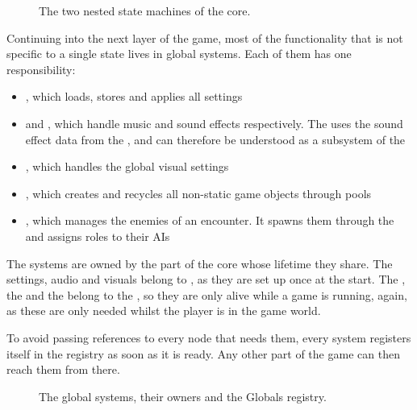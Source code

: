 \documentclass[../Main.tex]{subfiles}
\begin{document}
\begin{figure}[H]
    \centering
    
    \caption[The two nested state machines of the core. Own figure.]{The two nested state machines of the core.}
    \label{fig:core-state-machines}
\end{figure}

Continuing into the next layer of the game, most of the functionality that is not specific to a single state lives in global systems. Each of them has one responsibility:

\begin{itemize}
    \item {}, which loads, stores and applies all settings
    \item {} and , which handle music and sound effects respectively. The \linebreak{} uses the sound effect data from the , and can therefore be understood as a subsystem of the 
    \item {}, which handles the global visual settings
    \item {}, which creates and recycles all non-static game objects through pools
    \item {}, which manages the enemies of an encounter. It spawns them through the  and assigns roles to their AIs
\end{itemize}

The systems are owned by the part of the core whose lifetime they share. The settings, audio and visuals belong to , as they are set up once at the start. The , the  and the  belong to the , so they are only alive while a game is running, again, as these are only needed whilst the player is in the game world.

To avoid passing references to every node that needs them, every system registers itself in the  registry as soon as it is ready. Any other part of the game can then reach them from there.

\begin{figure}[H]
    \centering
    
    \caption[The global systems, their owners and the Globals registry. Own figure.]{The global systems, their owners and the Globals registry.}
    \label{fig:global-systems}
\end{figure}
\end{document}
